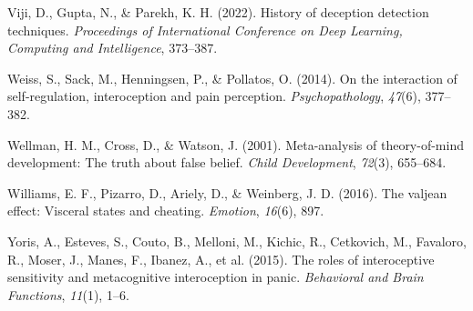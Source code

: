 \documentclass[
  man,floatsintext]{apa6}
\newlength{\cslhangindent}
\newlength{\cslentryspacingunit} %
\newenvironment{CSLReferences}[2] %
 {%
  \setlength{\parindent}{0pt}
  \ifodd #1
  \let\oldpar\par
  \def\par{\hangindent=\cslhangindent\oldpar}
  \fi
  \setlength{\parskip}{#2\cslentryspacingunit}
 }%
 {}
\begin{document}
\begin{CSLReferences}{1}{0}
\leavevmode{}%
Viji, D., Gupta, N., \& Parekh, K. H. (2022). History of deception detection techniques. \emph{Proceedings of International Conference on Deep Learning, Computing and Intelligence}, 373--387.

\leavevmode{}%
Weiss, S., Sack, M., Henningsen, P., \& Pollatos, O. (2014). On the interaction of self-regulation, interoception and pain perception. \emph{Psychopathology}, \emph{47}(6), 377--382.

\leavevmode{}%
Wellman, H. M., Cross, D., \& Watson, J. (2001). Meta-analysis of theory-of-mind development: The truth about false belief. \emph{Child Development}, \emph{72}(3), 655--684.

\leavevmode{}%
Williams, E. F., Pizarro, D., Ariely, D., \& Weinberg, J. D. (2016). The valjean effect: Visceral states and cheating. \emph{Emotion}, \emph{16}(6), 897.

\leavevmode{}%
Yoris, A., Esteves, S., Couto, B., Melloni, M., Kichic, R., Cetkovich, M., Favaloro, R., Moser, J., Manes, F., Ibanez, A., et al. (2015). The roles of interoceptive sensitivity and metacognitive interoception in panic. \emph{Behavioral and Brain Functions}, \emph{11}(1), 1--6.

\end{CSLReferences}

\endgroup
\end{document}
